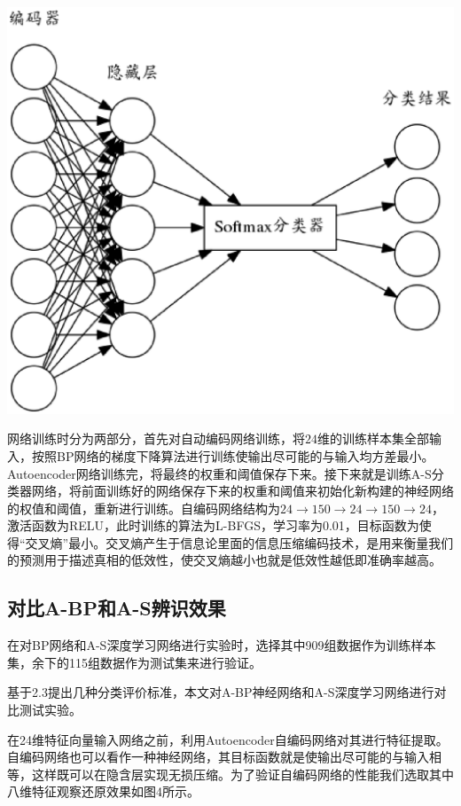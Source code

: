 \documentclass{ctacn}%
\begin{document}
\begin{multicols}{2}
\begin{center}
	\includegraphics[scale=0.12, trim=0 0 0 0]{figs/autoencoder_softmax}\\
	\label{fig4}
\end{center}

网络训练时分为两部分，首先对自动编码网络训练，将$24$维的训练样本集全部输入，按照BP网络的梯度下降算法进行训练使输出尽可能的与输入均方差最小。Autoencoder网络训练完，将最终的权重和阈值保存下来。接下来就是训练A-S分类器网络，将前面训练好的网络保存下来的权重和阈值来初始化新构建的神经网络的权值和阈值，重新进行训练。自编码网络结构为$24\rightarrow150\rightarrow24\rightarrow150\rightarrow24$，激活函数为RELU，此时训练的算法为L-BFGS，学习率为0.01，目标函数为使得“交叉熵”最小。交叉熵产生于信息论里面的信息压缩编码技术，是用来衡量我们的预测用于描述真相的低效性，使交叉熵越小也就是低效性越低即准确率越高。

\subsection{对比A-BP和A-S辨识效果}

在对BP网络和A-S深度学习网络进行实验时，选择其中909组数据作为训练样本集，余下的115组数据作为测试集来进行验证。

基于2.3提出几种分类评价标准，本文对A-BP神经网络和A-S深度学习网络进行对比测试实验。

在24维特征向量输入网络之前，利用Autoencoder自编码网络对其进行特征提取。自编码网络也可以看作一种神经网络，其目标函数就是使输出尽可能的与输入相等，这样既可以在隐含层实现无损压缩。为了验证自编码网络的性能我们选取其中八维特征观察还原效果如图4所示。


\end{multicols}
\end{document}
